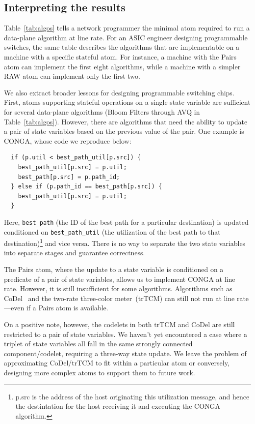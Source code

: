 \subsection{Interpreting the results}
Table~\ref{tab:algos} tells a network programmer the minimal atom required to
run a data-plane algorithm at line rate. For an ASIC engineer designing
programmable switches, the same table describes the algorithms that are
implementable on a \absmachine machine with a specific stateful atom. For
instance, a \absmachine machine with the Pairs atom can implement the first
eight algorithms, while a machine with a simpler RAW atom can implement only
the first two.

We also extract broader lessons for designing programmable switching chips.
First, atoms supporting stateful operations on a single state variable are
sufficient for several data-plane algorithms (Bloom Filters through AVQ in
Table~\ref{tab:algos}). However, there are algorithms that need the ability to
update a pair of state variables based on the previous value of the pair. One
example is CONGA, whose code we reproduce below:
\begin{verbatim}
  if (p.util < best_path_util[p.src]) {
    best_path_util[p.src] = p.util;
    best_path[p.src] = p.path_id;
  } else if (p.path_id == best_path[p.src]) {
    best_path_util[p.src] = p.util;
  }
\end{verbatim}
Here, \texttt{best\_path} (the ID of the best path for a particular
destination) is updated conditioned on \texttt{best\_path\_util} (the
utilization of the best path to that destination)\footnote{p.src is the address
  of the host originating this utilization message, and hence the
destintation for the host receiving it and executing the CONGA algorithm.} and
vice versa. There is no way to separate the two state variables into separate
stages and guarantee correctness.

The Pairs atom, where the update to a state variable is conditioned on a
predicate of a pair of state variables, allows us to implement CONGA at line
rate.  However, it is still insufficient for some algorithms. Algorithms such
as CoDel~\cite{codel} and the two-rate three-color meter~\cite{trTCM}(trTCM)
can still not run at line rate---even if a Pairs atom is available.

On a positive note, however, the codelets in both trTCM and CoDel are still
restricted to a pair of state variables.  We haven't yet encountered a case
where a triplet of state variables all fall in the same strongly connected
component/codelet, requiring a three-way state update.  We leave the problem of
approximating CoDel/trTCM to fit within a particular atom or conversely,
designing more complex atoms to support them to future work.

